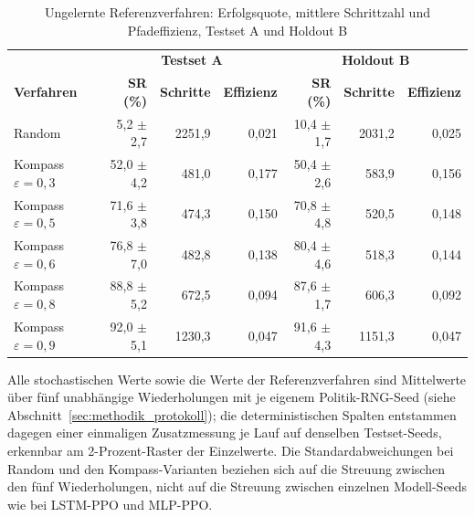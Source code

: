 \documentclass[
  a4paper,
  11pt,
  twoside,
  BCOR=8mm,           %
  headings=big,
  numbers=noenddot,
  listof=totoc,       %
  captions=tableheading,
]{scrreprt}
\begin{document}
\begin{table}[H]
    \centering
    \small
    \caption{Ungelernte Referenzverfahren: Erfolgsquote, mittlere Schrittzahl und Pfadeffizienz, Testset A und Holdout B}
    \label{tab:rohdaten_referenz}
    \begin{tabular}{lrrrrrr}
        \toprule
        & \multicolumn{3}{c}{\textbf{Testset A}} & \multicolumn{3}{c}{\textbf{Holdout B}} \\
        \textbf{Verfahren} & \textbf{SR (\%)} & \textbf{Schritte} & \textbf{Effizienz} & \textbf{SR (\%)} & \textbf{Schritte} & \textbf{Effizienz} \\
        \midrule
        Random & 5,2 $\pm$ 2,7 & 2251,9 & 0,021 & 10,4 $\pm$ 1,7 & 2031,2 & 0,025 \\
        Kompass $\varepsilon=0{,}3$ & 52,0 $\pm$ 4,2 & 481,0 & 0,177 & 50,4 $\pm$ 2,6 & 583,9 & 0,156 \\
        Kompass $\varepsilon=0{,}5$ & 71,6 $\pm$ 3,8 & 474,3 & 0,150 & 70,8 $\pm$ 4,8 & 520,5 & 0,148 \\
        Kompass $\varepsilon=0{,}6$ & 76,8 $\pm$ 7,0 & 482,8 & 0,138 & 80,4 $\pm$ 4,6 & 518,3 & 0,144 \\
        Kompass $\varepsilon=0{,}8$ & 88,8 $\pm$ 5,2 & 672,5 & 0,094 & 87,6 $\pm$ 1,7 & 606,3 & 0,092 \\
        Kompass $\varepsilon=0{,}9$ & 92,0 $\pm$ 5,1 & 1230,3 & 0,047 & 91,6 $\pm$ 4,3 & 1151,3 & 0,047 \\
        \bottomrule
    \end{tabular}
\end{table}

Alle stochastischen Werte sowie die Werte der Referenzverfahren sind Mittelwerte über fünf unabhängige Wiederholungen mit je eigenem Politik-RNG-Seed (siehe Abschnitt~\ref{sec:methodik_protokoll}); die deterministischen Spalten entstammen dagegen einer einmaligen Zusatzmessung je Lauf auf denselben Testset-Seeds, erkennbar am 2-Prozent-Raster der Einzelwerte. Die Standardabweichungen bei Random und den Kompass-Varianten beziehen sich auf die Streuung zwischen den fünf Wiederholungen, nicht auf die Streuung zwischen einzelnen Modell-Seeds wie bei LSTM-PPO und MLP-PPO.
\end{document}
